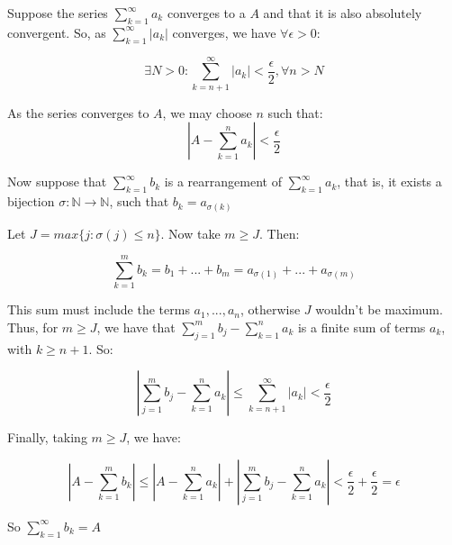 \documentclass[12pt]{article}
\begin{document}
Suppose the series $\sum_{k=1}^\infty a_k$ converges to a $A$ and that it is also absolutely convergent. So, as $\sum_{k=1}^\infty |a_k|$ converges, we have $\forall \epsilon >0$:

$$\exists N>0:\sum_{k=n+1}^\infty |a_k|<\frac{\epsilon}{2}, \forall n>N$$

As the series converges to $A$, we may choose $n$ such that:
$$|A-\sum_{k=1}^n a_k|<\frac{\epsilon}{2}$$

Now suppose that $\sum_{k=1}^\infty b_k$ is a rearrangement of $\sum_{k=1}^\infty a_k$, that is, it exists a bijection $\sigma:\mathbb{N}\rightarrow \mathbb{N}$, such that $b_k=a_{\sigma(k)}$

Let $J=max\lbrace j:\sigma(j)\leq n \rbrace$. Now take $m\geq J$. Then:

$$\sum_{k=1}^m b_k=b_1+...+b_m=a_{\sigma(1)}+...+a_{\sigma(m)}$$

This sum must include the terms $a_1,...,a_n$, otherwise $J$ wouldn't be maximum. Thus, for $m\geq J$, we have that $\sum_{j=1}^m b_j - \sum_{k=1}^n a_k$ is a finite sum of terms $a_k$, with $k\geq n+1$. So:

$$|\sum_{j=1}^m b_j - \sum_{k=1}^n a_k|\leq \sum_{k=n+1}^\infty |a_k|<\frac{\epsilon}{2}$$

Finally, taking $m\geq J$, we have:

$$|A-\sum_{k=1}^m b_k|\leq |A-\sum_{k=1}^n a_k|+|\sum_{j=1}^m b_j - \sum_{k=1}^n a_k|<\frac{\epsilon}{2}+\frac{\epsilon}{2}=\epsilon$$

So $\sum_{k=1}^\infty b_k=A$



\end{document}
